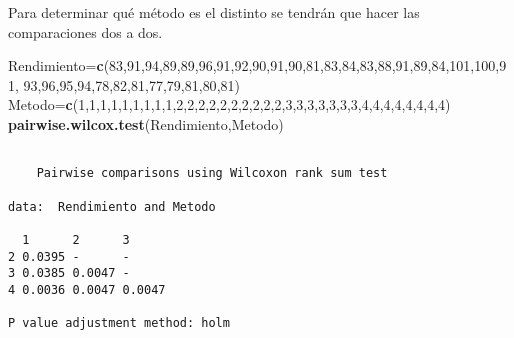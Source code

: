 \documentclass[
  a4paper,
  oneside,
  openany]{book}
\newenvironment{Shaded}{\begin{snugshade}}{\end{snugshade}}
\newcommand{\DecValTok}[1]{\textcolor[rgb]{0.00,0.00,0.81}{#1}}
\newcommand{\FunctionTok}[1]{\textcolor[rgb]{0.13,0.29,0.53}{\textbf{#1}}}
\newcommand{\NormalTok}[1]{#1}
\newcommand{\OtherTok}[1]{\textcolor[rgb]{0.56,0.35,0.01}{#1}}
\begin{document}
Para determinar qué método es el distinto se tendrán que hacer las comparaciones dos a dos.

\begin{Shaded}
\begin{Highlighting}[]
\NormalTok{Rendimiento}\OtherTok{=}\FunctionTok{c}\NormalTok{(}\DecValTok{83}\NormalTok{,}\DecValTok{91}\NormalTok{,}\DecValTok{94}\NormalTok{,}\DecValTok{89}\NormalTok{,}\DecValTok{89}\NormalTok{,}\DecValTok{96}\NormalTok{,}\DecValTok{91}\NormalTok{,}\DecValTok{92}\NormalTok{,}\DecValTok{90}\NormalTok{,}\DecValTok{91}\NormalTok{,}\DecValTok{90}\NormalTok{,}\DecValTok{81}\NormalTok{,}\DecValTok{83}\NormalTok{,}\DecValTok{84}\NormalTok{,}\DecValTok{83}\NormalTok{,}\DecValTok{88}\NormalTok{,}\DecValTok{91}\NormalTok{,}\DecValTok{89}\NormalTok{,}\DecValTok{84}\NormalTok{,}\DecValTok{101}\NormalTok{,}\DecValTok{100}\NormalTok{,}\DecValTok{91}\NormalTok{,}
              \DecValTok{93}\NormalTok{,}\DecValTok{96}\NormalTok{,}\DecValTok{95}\NormalTok{,}\DecValTok{94}\NormalTok{,}\DecValTok{78}\NormalTok{,}\DecValTok{82}\NormalTok{,}\DecValTok{81}\NormalTok{,}\DecValTok{77}\NormalTok{,}\DecValTok{79}\NormalTok{,}\DecValTok{81}\NormalTok{,}\DecValTok{80}\NormalTok{,}\DecValTok{81}\NormalTok{)}
\NormalTok{Metodo}\OtherTok{=}\FunctionTok{c}\NormalTok{(}\DecValTok{1}\NormalTok{,}\DecValTok{1}\NormalTok{,}\DecValTok{1}\NormalTok{,}\DecValTok{1}\NormalTok{,}\DecValTok{1}\NormalTok{,}\DecValTok{1}\NormalTok{,}\DecValTok{1}\NormalTok{,}\DecValTok{1}\NormalTok{,}\DecValTok{1}\NormalTok{,}\DecValTok{2}\NormalTok{,}\DecValTok{2}\NormalTok{,}\DecValTok{2}\NormalTok{,}\DecValTok{2}\NormalTok{,}\DecValTok{2}\NormalTok{,}\DecValTok{2}\NormalTok{,}\DecValTok{2}\NormalTok{,}\DecValTok{2}\NormalTok{,}\DecValTok{2}\NormalTok{,}\DecValTok{2}\NormalTok{,}\DecValTok{3}\NormalTok{,}\DecValTok{3}\NormalTok{,}\DecValTok{3}\NormalTok{,}\DecValTok{3}\NormalTok{,}\DecValTok{3}\NormalTok{,}\DecValTok{3}\NormalTok{,}\DecValTok{3}\NormalTok{,}\DecValTok{4}\NormalTok{,}\DecValTok{4}\NormalTok{,}\DecValTok{4}\NormalTok{,}\DecValTok{4}\NormalTok{,}\DecValTok{4}\NormalTok{,}\DecValTok{4}\NormalTok{,}\DecValTok{4}\NormalTok{,}\DecValTok{4}\NormalTok{)}
\FunctionTok{pairwise.wilcox.test}\NormalTok{(Rendimiento,Metodo)}
\end{Highlighting}
\end{Shaded}

\begin{verbatim}

    Pairwise comparisons using Wilcoxon rank sum test 

data:  Rendimiento and Metodo 

  1      2      3     
2 0.0395 -      -     
3 0.0385 0.0047 -     
4 0.0036 0.0047 0.0047

P value adjustment method: holm 
\end{verbatim}
\end{document}
